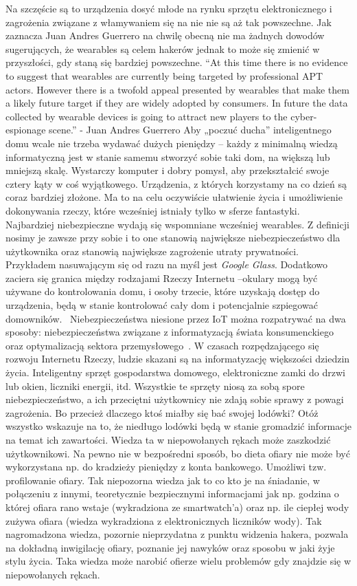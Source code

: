 \documentclass[brudnopis]{xmgr}
\begin{document}
Na szczęście są to urządzenia dosyć młode na rynku sprzętu elektronicznego i zagrożenia związane z włamywaniem się na nie nie są aż tak powszechne. Jak zaznacza Juan Andres Guerrero na chwilę obecną nie ma żadnych dowodów sugerujących, że wearables są celem hakerów jednak to może się zmienić w przyszłości, gdy staną się bardziej powszechne.
“At this time there is no evidence to suggest that wearables are currently being targeted by professional APT actors. However there is a twofold appeal presented by wearables that make them a likely future target if they are widely adopted by consumers.  In future the data collected by wearable devices is going to attract new players to the cyber-espionage scene.” -  Juan Andres Guerrero
Aby „poczuć ducha” inteligentnego domu wcale nie trzeba wydawać dużych pieniędzy – każdy z minimalną wiedzą informatyczną jest w stanie samemu stworzyć sobie taki dom, na większą lub mniejszą skalę. Wystarczy komputer i dobry pomysł, aby przekształcić swoje cztery kąty w coś wyjątkowego.
Urządzenia, z których korzystamy na co dzień są coraz bardziej złożone. Ma to na celu oczywiście ułatwienie życia i umożliwienie dokonywania rzeczy, które wcześniej istniały tylko w sferze fantastyki.
Najbardziej niebezpieczne wydają się wspomniane wcześniej wearables. Z definicji nosimy je zawsze przy sobie i to one stanowią największe niebezpieczeństwo dla użytkownika oraz stanowią największe zagrożenie utraty prywatności. Przykładem nasuwającym się od razu na myśl jest \emph{Google Glass}. Dodatkowo zaciera się granica między rodzajami Rzeczy Internetu –okulary mogą być używane do kontrolowania domu, i osoby trzecie, które uzyskają dostęp do urządzenia, będą w stanie kontrolować cały dom i potencjalnie  szpiegować domowników.~\cite{Kaspersky:2014:CMC}
Niebezpieczeństwa niesione przez IoT można rozpatrywać na dwa sposoby: niebezpieczeństwa związane z informatyzacją świata konsumenckiego oraz optymalizacją sektora przemysłowego~\cite{Ks:2014:CMC}. W czasach rozpędzającego się rozwoju Internetu Rzeczy, ludzie skazani są na informatyzację większości dziedzin życia. Inteligentny sprzęt gospodarstwa domowego, elektroniczne zamki do drzwi lub okien, liczniki energii, itd. Wszystkie te sprzęty niosą za sobą spore niebezpieczeństwo, a ich przeciętni użytkownicy nie zdają sobie sprawy z powagi zagrożenia. Bo przecież dlaczego ktoś miałby się bać swojej lodówki? Otóż wszystko wskazuje na to, że niedługo lodówki będą w stanie gromadzić informacje na temat ich zawartości. Wiedza ta w niepowołanych rękach może zaszkodzić użytkownikowi. Na pewno nie w bezpośredni sposób, bo dieta ofiary nie może być wykorzystana np. do kradzieży pieniędzy z konta bankowego. Umożliwi tzw. profilowanie ofiary. Tak niepozorna wiedza jak to co kto je na śniadanie, w połączeniu z innymi, teoretycznie bezpiecznymi informacjami jak np. godzina o której ofiara rano wstaje (wykradziona ze smartwatch'a) oraz np. ile ciepłej wody zużywa ofiara (wiedza wykradziona z elektronicznych liczników wody). Tak nagromadzona wiedza, pozornie nieprzydatna z punktu widzenia hakera, pozwala na dokładną inwigilację ofiary, poznanie jej nawyków oraz sposobu w jaki żyje stylu życia. Taka wiedza może narobić ofierze wielu problemów gdy znajdzie się w niepowołanych rękach.
\end{document}

